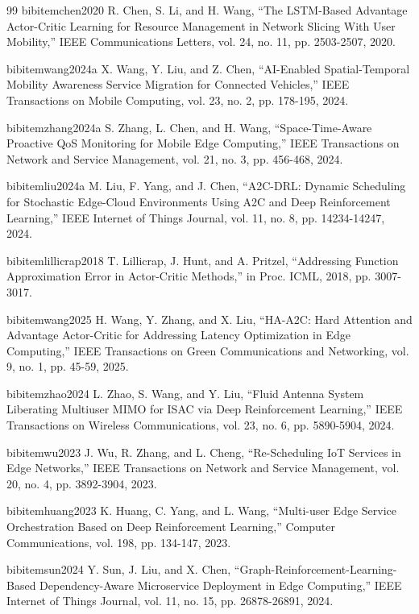 \begin{thebibliography}{99}
	bibitem{chen2020} R. Chen, S. Li, and H. Wang, ``The LSTM-Based Advantage Actor-Critic Learning for Resource Management in Network Slicing With User Mobility,'' IEEE Communications Letters, vol. 24, no. 11, pp. 2503-2507, 2020.

	bibitem{wang2024a} X. Wang, Y. Liu, and Z. Chen, ``AI-Enabled Spatial-Temporal Mobility Awareness Service Migration for Connected Vehicles,'' IEEE Transactions on Mobile Computing, vol. 23, no. 2, pp. 178-195, 2024.

	bibitem{zhang2024a} S. Zhang, L. Chen, and H. Wang, ``Space-Time-Aware Proactive QoS Monitoring for Mobile Edge Computing,'' IEEE Transactions on Network and Service Management, vol. 21, no. 3, pp. 456-468, 2024.

	bibitem{liu2024a} M. Liu, F. Yang, and J. Chen, ``A2C-DRL: Dynamic Scheduling for Stochastic Edge-Cloud Environments Using A2C and Deep Reinforcement Learning,'' IEEE Internet of Things Journal, vol. 11, no. 8, pp. 14234-14247, 2024.

	bibitem{lillicrap2018} T. Lillicrap, J. Hunt, and A. Pritzel, ``Addressing Function Approximation Error in Actor-Critic Methods,'' in Proc. ICML, 2018, pp. 3007-3017.

	bibitem{wang2025} H. Wang, Y. Zhang, and X. Liu, ``HA-A2C: Hard Attention and Advantage Actor-Critic for Addressing Latency Optimization in Edge Computing,'' IEEE Transactions on Green Communications and Networking, vol. 9, no. 1, pp. 45-59, 2025.

	bibitem{zhao2024} L. Zhao, S. Wang, and Y. Liu, ``Fluid Antenna System Liberating Multiuser MIMO for ISAC via Deep Reinforcement Learning,'' IEEE Transactions on Wireless Communications, vol. 23, no. 6, pp. 5890-5904, 2024.

	bibitem{wu2023} J. Wu, R. Zhang, and L. Cheng, ``Re-Scheduling IoT Services in Edge Networks,'' IEEE Transactions on Network and Service Management, vol. 20, no. 4, pp. 3892-3904, 2023.

	bibitem{huang2023} K. Huang, C. Yang, and L. Wang, ``Multi-user Edge Service Orchestration Based on Deep Reinforcement Learning,'' Computer Communications, vol. 198, pp. 134-147, 2023.

	bibitem{sun2024} Y. Sun, J. Liu, and X. Chen, ``Graph-Reinforcement-Learning-Based Dependency-Aware Microservice Deployment in Edge Computing,'' IEEE Internet of Things Journal, vol. 11, no. 15, pp. 26878-26891, 2024.


\end{thebibliography}
